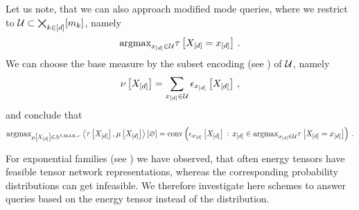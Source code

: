 Let us note, that we can also approach modified mode queries, where we restrict to $\mathcal{U}\subset\bigtimes_{k\in[d]}[m_{k}]$, namely
\begin{align*}
    \mathrm{argmax}_{x_{[d]}\in\mathcal{U}} \tau\left[X_{[d]}=x_{[d]}\right] \, .
\end{align*}
We can choose the base measure by the subset encoding (see ) of $\mathcal{U}$, namely
\begin{align*}
    \nu\left[X_{[d]}\right] = \sum_{x_{[d]}\in\mathcal{U}} \epsilon_{x_{[d]}}\left[X_{[d]}\right] \, ,
\end{align*}
and conclude that
\begin{align*}
    \mathrm{argmax}_{\mu\left[X_{[d]}\right]\in\Lambda^{\delta,\mathrm{MAX},\nu}} \left\langle \tau\left[X_{[d]}\right],\mu\left[X_{[d]}\right]\right\rangle \left[ \varnothing \right]
    = \mathrm{conv}\left(\epsilon_{x_{[d]}}\left[X_{[d]}\right] \, : \, x_{[d]}\in\mathrm{argmax}_{x_{[d]}\in\mathcal{U}} \tau\left[X_{[d]}=x_{[d]}\right]\right) \, .
\end{align*}




For exponential families (see ) we have observed, that often energy tensors have feasible tensor network representations, whereas the corresponding probability distributions can get infeasible.
We therefore investigate here schemes to answer queries based on the energy tensor instead of the distribution.


